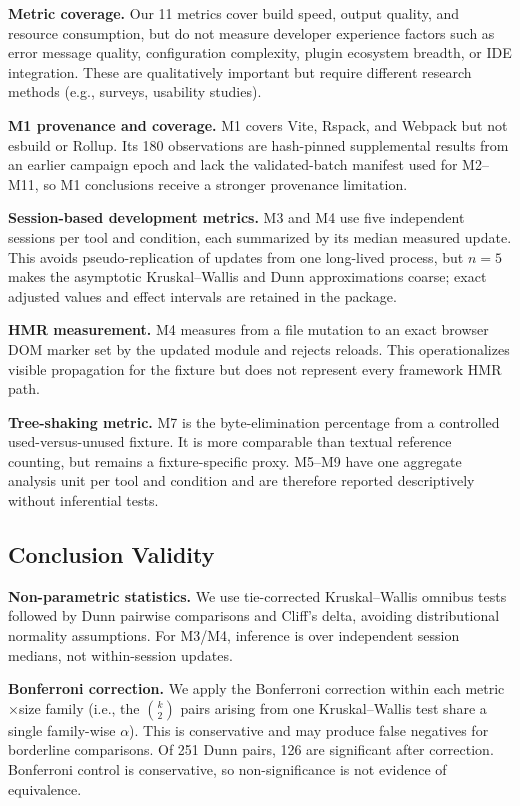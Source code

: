 \documentclass[preprint,12pt]{elsarticle}
\begin{document}
\textbf{Metric coverage.}
Our 11 metrics cover build speed, output quality, and resource consumption, but do not measure developer experience factors such as error message quality, configuration complexity, plugin ecosystem breadth, or IDE integration.
These are qualitatively important but require different research methods (e.g., surveys, usability studies).

\textbf{M1 provenance and coverage.}
M1 covers Vite, Rspack, and Webpack but not esbuild or Rollup.
Its 180 observations are hash-pinned supplemental results from an earlier campaign epoch and lack the validated-batch manifest used for M2--M11, so M1 conclusions receive a stronger provenance limitation.

\textbf{Session-based development metrics.}
M3 and M4 use five independent sessions per tool and condition, each summarized by its median measured update.
This avoids pseudo-replication of updates from one long-lived process, but $n=5$ makes the asymptotic Kruskal--Wallis and Dunn approximations coarse; exact adjusted values and effect intervals are retained in the package.

\textbf{HMR measurement.}
M4 measures from a file mutation to an exact browser DOM marker set by the updated module and rejects reloads.
This operationalizes visible propagation for the fixture but does not represent every framework HMR path.

\textbf{Tree-shaking metric.}
M7 is the byte-elimination percentage from a controlled used-versus-unused fixture.
It is more comparable than textual reference counting, but remains a fixture-specific proxy.
M5--M9 have one aggregate analysis unit per tool and condition and are therefore reported descriptively without inferential tests.

\subsection{Conclusion Validity}

\textbf{Non-parametric statistics.}
We use tie-corrected Kruskal--Wallis omnibus tests followed by Dunn pairwise comparisons and Cliff's delta, avoiding distributional normality assumptions.
For M3/M4, inference is over independent session medians, not within-session updates.

\textbf{Bonferroni correction.}
We apply the Bonferroni correction within each metric$\times$size family (i.e., the $\binom{k}{2}$ pairs arising from one Kruskal--Wallis test share a single family-wise $\alpha$).
This is conservative and may produce false negatives for borderline comparisons.
Of 251 Dunn pairs, 126 are significant after correction.
Bonferroni control is conservative, so non-significance is not evidence of equivalence.
\end{document}
